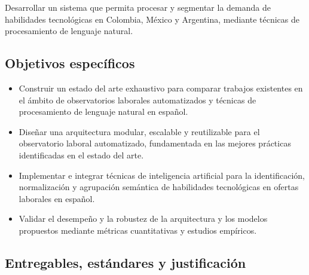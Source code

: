 Desarrollar un sistema que permita procesar y segmentar la demanda de habilidades tecnológicas en Colombia, México y Argentina, mediante técnicas de procesamiento de lenguaje natural.

\subsection{Objetivos específicos}

\begin{itemize}
    \item Construir un estado del arte exhaustivo para comparar trabajos existentes en el ámbito de observatorios laborales automatizados y técnicas de procesamiento de lenguaje natural en español.

    \item Diseñar una arquitectura modular, escalable y reutilizable para el observatorio laboral automatizado, fundamentada en las mejores prácticas identificadas en el estado del arte.

    \item Implementar e integrar técnicas de inteligencia artificial para la identificación, normalización y agrupación semántica de habilidades tecnológicas en ofertas laborales en español.

    \item Validar el desempeño y la robustez de la arquitectura y los modelos propuestos mediante métricas cuantitativas y estudios empíricos.
\end{itemize}

\subsection{Entregables, estándares y justificación}

